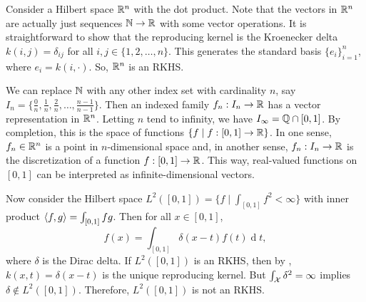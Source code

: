 Consider a Hilbert space \(\mathbb{R}^n\) with the dot product.
Note that the vectors in \(\mathbb{R}^n\) are actually just sequences \(\mathbb{N} \to \mathbb{R}\) with some vector operations.
It is straightforward to show that the reproducing kernel is the Kroenecker delta \(k(i,j) = \delta_{ij}\) for all \(i,j \in \{1,2,\dots,n\}\).
This generates the standard basis \(\{e_i\}_{i=1}^n\), where \(e_i = k(i,\cdot)\).
So, \(\mathbb{R}^n\) is an RKHS.

We can replace \(\mathbb{N}\) with any other index set with cardinality \(n\), say \(I_n = \{\frac{0}{n}, \frac{1}{n}, \frac{2}{n}, \dots, \frac{n-1}{n-1}\}\).
Then an indexed family \(f_n : I_n \to \mathbb{R}\) has a vector representation in \(\mathbb{R}^n\).
Letting \(n\) tend to infinity, we have \(I_\infty = \mathbb{Q} \cap [0,1]\).
By completion, this is the space of functions \(\{f \mid f : [0,1] \to \mathbb{R}\}\).
In one sense, \(f_n \in \mathbb{R}^n\) is a point in \(n\)-dimensional space and, in another sense, \(f_n : I_n \to \mathbb{R}\) is the discretization of a function \(f : [0,1] \to \mathbb{R}\).
This way, real-valued functions on \([0,1]\) can be interpreted as infinite-dimensional vectors.

Now consider the Hilbert space \(L^2({[0,1]}) = \{f \mid \int_{[0,1]} f^2 < \infty\}\) with inner product \(\left\langle f,g \right\rangle = \int_{[0,1]} fg\).
Then for all \(x \in {[0,1]}\),
\def\dd{\operatorname{d}}
\begin{equation}
    f(x) = \int_{[0,1]} \delta(x-t) f(t) \dd{t},
\end{equation}
where \(\delta\) is the Dirac delta.
If \(L^2({[0,1]})\) is an RKHS, then by , \(k(x,t) = \delta(x-t)\) is the unique reproducing kernel.
But \(\int_{\mathcal{X}} \delta^2 = \infty\) implies \(\delta \notin L^2({[0,1]})\).
Therefore, \(L^2({[0,1]})\) is not an RKHS.